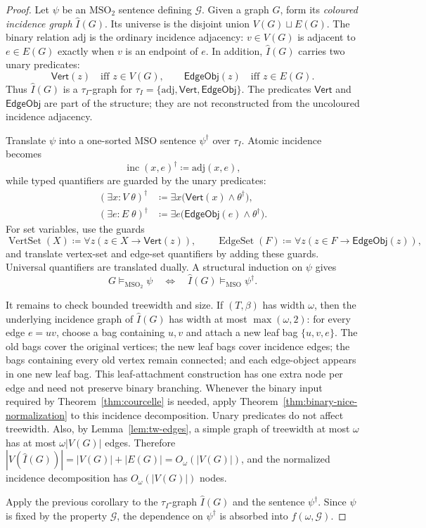 \documentclass[11pt]{article}
\theoremstyle{definition}
\newcommand{\MSO}{\ensuremath{\mathrm{MSO}}}
\newcommand{\MSOtwo}{\ensuremath{\mathrm{MSO}_2}}
\newcommand{\defeq}{\coloneqq}
\newcommand{\adj}{\mathrm{adj}}
\newcommand{\Vrt}{\mathsf{Vert}}
\newcommand{\EObj}{\mathsf{EdgeObj}}
\begin{document}
\begin{proof}
Let \(\psi\) be an \MSOtwo{} sentence defining \(\mathcal G\).  Given a graph
\(G\), form its \emph{coloured incidence graph} \(\widehat I(G)\).  Its universe
is the disjoint union \(V(G)\sqcup E(G)\).  The binary relation \(\adj\) is the
ordinary incidence adjacency: \(v\in V(G)\) is adjacent to \(e\in E(G)\) exactly
when \(v\) is an endpoint of \(e\).  In addition, \(\widehat I(G)\) carries two
unary predicates:
\[
  \Vrt(z) \quad\text{iff } z\in V(G),
  \qquad
  \EObj(z) \quad\text{iff } z\in E(G).
\]
Thus \(\widehat I(G)\) is a \(\tau_I\)-graph for
\(\tau_I=\{\adj,\Vrt,\EObj\}\).  The predicates \(\Vrt\) and \(\EObj\) are part
of the structure; they are not reconstructed from the uncoloured incidence
adjacency.

Translate \(\psi\) into a one-sorted \MSO{} sentence \(\psi^\dagger\) over
\(\tau_I\).  Atomic incidence becomes
\[
  \operatorname{inc}(x,e)^\dagger \defeq \adj(x,e),
\]
while typed quantifiers are guarded by the unary predicates:
\[
\begin{aligned}
  (\exists x\!:\!V\;\theta)^\dagger
    &\defeq \exists x\bigl(\Vrt(x)\wedge\theta^\dagger\bigr),\\
  (\exists e\!:\!E\;\theta)^\dagger
    &\defeq \exists e\bigl(\EObj(e)\wedge\theta^\dagger\bigr).
\end{aligned}
\]
For set variables, use the guards
\[
  \operatorname{VertSet}(X)\defeq
    \forall z(z\in X\to\Vrt(z)),\qquad
  \operatorname{EdgeSet}(F)\defeq
    \forall z(z\in F\to\EObj(z)),
\]
and translate vertex-set and edge-set quantifiers by adding these guards.
Universal quantifiers are translated dually.  A structural induction on
\(\psi\) gives
\[
  G\models_{\MSOtwo}\psi
  \quad\Longleftrightarrow\quad
  \widehat I(G)\models_{\MSO}\psi^\dagger .
\]

It remains to check bounded treewidth and size.  If \((T,\beta)\) has width
\(\omega\), then the underlying incidence graph of \(\widehat I(G)\) has width at
most \(\max(\omega,2)\): for every edge \(e=uv\), choose a bag containing \(u,v\)
and attach a new leaf bag \(\{u,v,e\}\).  The old bags cover the original
vertices; the new leaf bags cover incidence edges; the bags containing every
old vertex remain connected; and each edge-object appears in one new leaf bag.
This leaf-attachment construction has one extra node per edge and need not
preserve binary branching.  Whenever the binary input required by
Theorem~\ref{thm:courcelle} is needed, apply
Theorem~\ref{thm:binary-nice-normalization} to this incidence decomposition.
Unary predicates do not affect treewidth.  Also, by Lemma~\ref{lem:tw-edges}, a
simple graph of treewidth at most \(\omega\) has at most \(\omega|V(G)|\) edges.
Therefore \(|V(\widehat I(G))|=|V(G)|+|E(G)|=O_\omega(|V(G)|)\), and the normalized
incidence decomposition has \(O_\omega(|V(G)|)\) nodes.

Apply the previous corollary to the \(\tau_I\)-graph \(\widehat I(G)\) and the
sentence \(\psi^\dagger\).  Since \(\psi\) is fixed by the property
\(\mathcal G\), the dependence on \(\psi^\dagger\) is absorbed into
\(f(\omega,\mathcal G)\).
\end{proof}
\end{document}
